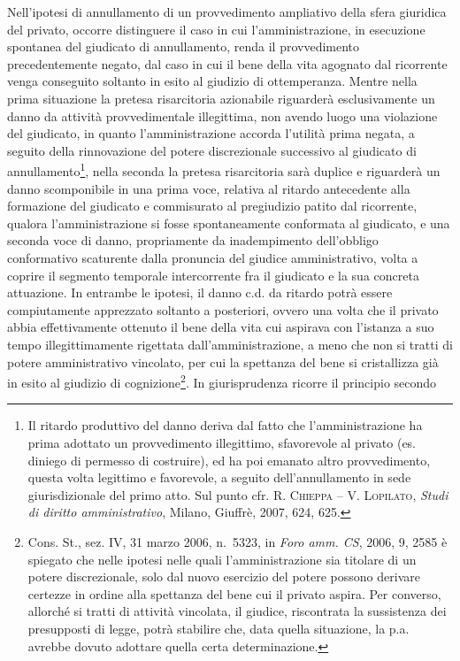 \documentclass[12pt,it,a4paper,]{report}
\begin{document}
Nell'ipotesi di annullamento di un provvedimento ampliativo della sfera
giuridica del privato, occorre distinguere il caso in cui
l'amministrazione, in esecuzione spontanea del giudicato di
annullamento, renda il provvedimento precedentemente negato, dal caso in
cui il bene della vita agognato dal ricorrente venga conseguito soltanto
in esito al giudizio di ottemperanza. Mentre nella prima situazione la
pretesa risarcitoria azionabile riguarderà esclusivamente un danno da
attività provvedimentale illegittima, non avendo luogo una violazione
del giudicato, in quanto l'amministrazione accorda l'utilità prima
negata, a seguito della rinnovazione del potere discrezionale successivo
al giudicato di annullamento\footnote{Il ritardo produttivo del danno
  deriva dal fatto che l'amministrazione ha prima adottato un
  provvedimento illegittimo, sfavorevole al privato (es. diniego di
  permesso di costruire), ed ha poi emanato altro provvedimento, questa
  volta legittimo e favorevole, a seguito dell'annullamento in sede
  giurisdizionale del primo atto. Sul punto cfr. R. \textsc{Chieppa} --
  V. \textsc{Lopilato}, \emph{Studi di diritto amministrativo}, Milano,
  Giuffrè, 2007, 624, 625.}, nella seconda la pretesa risarcitoria sarà
duplice e riguarderà un danno scomponibile in una prima voce, relativa
al ritardo antecedente alla formazione del giudicato e commisurato al
pregiudizio patito dal ricorrente, qualora l'amministrazione si fosse
spontaneamente conformata al giudicato, e una seconda voce di danno,
propriamente da inadempimento dell'obbligo conformativo scaturente dalla
pronuncia del giudice amministrativo, volta a coprire il segmento
temporale intercorrente fra il giudicato e la sua concreta attuazione.
In entrambe le ipotesi, il danno c.d. da ritardo potrà essere
compiutamente apprezzato soltanto a posteriori, ovvero una volta che il
privato abbia effettivamente ottenuto il bene della vita cui aspirava
con l'istanza a suo tempo illegittimamente rigettata
dall'amministrazione, a meno che non si tratti di potere amministrativo
vincolato, per cui la spettanza del bene si cristallizza già in esito al
giudizio di cognizione\footnote{Cons. St., sez. IV, 31 marzo 2006,
  n.~5323, in \emph{Foro amm. CS}, 2006, 9, 2585 è spiegato che nelle
  ipotesi nelle quali l'amministrazione sia titolare di un potere
  discrezionale, solo dal nuovo esercizio del potere possono derivare
  certezze in ordine alla spettanza del bene cui il privato aspira. Per
  converso, allorché si tratti di attività vincolata, il giudice,
  riscontrata la sussistenza dei presupposti di legge, potrà stabilire
  che, data quella situazione, la p.a. avrebbe dovuto adottare quella
  certa determinazione.}. In giurisprudenza ricorre il principio secondo
\end{document}
